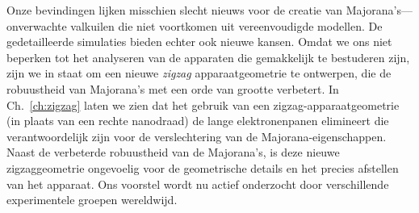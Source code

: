 {
Onze bevindingen lijken misschien slecht nieuws voor de creatie van Majorana's---onverwachte valkuilen die niet voortkomen uit vereenvoudigde modellen.
De gedetailleerde simulaties bieden echter ook nieuwe kansen.
Omdat we ons niet beperken tot het analyseren van de apparaten die gemakkelijk te bestuderen zijn, zijn we in staat om een nieuwe \emph{zigzag} apparaatgeometrie te ontwerpen, die de robuustheid van Majorana's met een orde van grootte verbetert.
In Ch.~\ref{ch:zigzag} laten we zien dat het gebruik van een zigzag-apparaatgeometrie (in plaats van een rechte nanodraad) de lange elektronenpanen elimineert die verantwoordelijk zijn voor de verslechtering van de Majorana-eigenschappen.
Naast de verbeterde robuustheid van de Majorana's, is deze nieuwe zigzaggeometrie ongevoelig voor de geometrische details en het precies afstellen van het apparaat.
Ons voorstel wordt nu actief onderzocht door verschillende experimentele groepen wereldwijd.
}